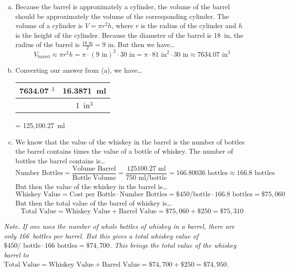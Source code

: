 \documentclass[11pt,letterpaper]{article}
\begin{document}
\sol 
\begin{enumerate}[(a)]
\item Because the barrel is approximately a cylinder, the volume of the barrel should be approximately the volume of the corresponding cylinder. The volume of a cylinder is $V= \pi r^2 h$, where $r$ is the radius of the cylinder and $h$ is the height of the cylinder. Because the diameter of the barrel is 18~in, the radius of the barrel is $\frac{18 \text{ in}}{2}= 9 \text{ in}$. But then we have\dots
	\[
	V_{\text{barrel}} \approx \pi r^2 h= \pi \cdot (9 \text{ in})^2 \cdot 30 \text{ in}= \pi \cdot 81 \text{ in}^2 \cdot 30 \text{ in} \approx 7634.07 \text{ in}^3
	\] \pspace

\item Converting our answer from (a), we have\dots \par
	\begin{table}[H]
	\centering
	\begin{tabular}{c||c}
	7634.07 \text{ in}$^3$ & 16.3871~ml \\ \hline
				       & 1~in$^3$ 
	\end{tabular} = 125,100.27~ml
	\end{table} \pspace

\item We know that the value of the whiskey in the barrel is the number of bottles the barrel contains times the value of a bottle of whiskey. The number of bottles the barrel contains is\dots
	\[
	\text{Number Bottles}= \frac{\text{Volume Barrel}}{\text{Bottle Volume}}= \frac{125100.27 \text{ ml}}{750 \text{ ml/bottle}} = 166.80036 \text{ bottles} \approx 166.8 \text{ bottles}
	\] \pspace
But then the value of the whiskey in the barrel is\dots 
	\[
	\text{Whiskey Value}= \text{Cost per Bottle} \cdot \text{Number Bottles}= \$450 \text{/bottle} \cdot 166.8 \text{ bottles}= \$75,060
	\] 
But then the total value of the barrel of whiskey is\dots
	\[
	\text{Total Value}= \text{Whiskey Value} + \text{Barrel Value}= \$75,060 + \$250= \$75,310
	\]
\end{enumerate} \vfill

{\itshape Note. If one uses the number of whole bottles of whiskey in a barrel, there are only 166~bottles per barrel. But this gives a total whiskey value of $\$450/\text{ bottle} \cdot 166 \text{ bottles}= \$74,\!700$. This brings the total value of the whiskey barrel to $\text{Total Value}= \text{Whiskey Value} + \text{Barrel Value}= \$74,\!700 + \$250= \$74,\!950$.}
\end{document}
